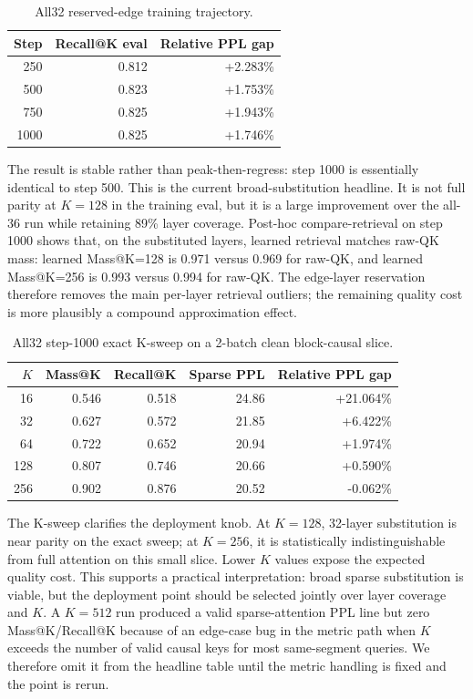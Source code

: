 \documentclass[10pt]{article}
\begin{document}
\begin{table}[h]
\centering
\caption{All32 reserved-edge training trajectory.}
\begin{tabular}{rrr}
\toprule
Step & Recall@K eval & Relative PPL gap\\
\midrule
250 & 0.812 & +2.283\%\\
500 & 0.823 & +1.753\%\\
750 & 0.825 & +1.943\%\\
1000 & 0.825 & +1.746\%\\
\bottomrule
\end{tabular}
\end{table}

The result is stable rather than peak-then-regress: step 1000 is essentially
identical to step 500. This is the current broad-substitution headline. It is
not full parity at $K=128$ in the training eval, but it is a large improvement
over the all-36 run while retaining 89\% layer coverage. Post-hoc
compare-retrieval on step 1000 shows that, on the substituted layers, learned
retrieval matches raw-QK mass: learned Mass@K=128 is 0.971 versus 0.969 for
raw-QK, and learned Mass@K=256 is 0.993 versus 0.994 for raw-QK. The edge-layer
reservation therefore removes the main per-layer retrieval outliers; the
remaining quality cost is more plausibly a compound approximation effect.

\begin{table}[h]
\centering
\caption{All32 step-1000 exact K-sweep on a 2-batch clean block-causal slice.}
\begin{tabular}{rrrrr}
\toprule
$K$ & Mass@K & Recall@K & Sparse PPL & Relative PPL gap\\
\midrule
16 & 0.546 & 0.518 & 24.86 & +21.064\%\\
32 & 0.627 & 0.572 & 21.85 & +6.422\%\\
64 & 0.722 & 0.652 & 20.94 & +1.974\%\\
128 & 0.807 & 0.746 & 20.66 & +0.590\%\\
256 & 0.902 & 0.876 & 20.52 & -0.062\%\\
\bottomrule
\end{tabular}
\end{table}

The K-sweep clarifies the deployment knob. At $K=128$, 32-layer substitution is
near parity on the exact sweep; at $K=256$, it is statistically indistinguishable
from full attention on this small slice. Lower $K$ values expose the expected
quality cost. This supports a practical interpretation: broad sparse
substitution is viable, but the deployment point should be selected jointly over
layer coverage and $K$. A $K=512$ run produced a valid sparse-attention PPL line
but zero Mass@K/Recall@K because of an edge-case bug in the metric path when
$K$ exceeds the number of valid causal keys for most same-segment queries. We
therefore omit it from the headline table until the metric handling is fixed
and the point is rerun.
\end{document}
